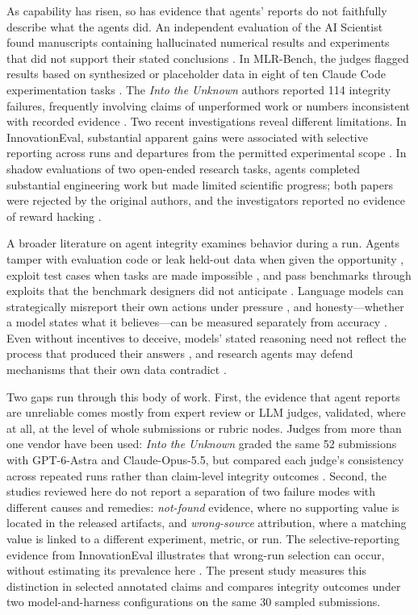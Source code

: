 \documentclass[preprint,12pt,authoryear]{elsarticle}
\begin{document}
As capability has risen, so has evidence that agents' reports do not faithfully describe what the agents did. An independent evaluation of the AI Scientist found manuscripts containing hallucinated numerical results and experiments that did not support their stated conclusions \citep{beel2025sakana}. In MLR-Bench, the judges flagged results based on synthesized or placeholder data in eight of ten Claude Code experimentation tasks \citep{chen2025mlrbench}. The \emph{Into the Unknown} authors reported 114 integrity failures, frequently involving claims of unperformed work or numbers inconsistent with recorded evidence \citep{kim2026unknown}. Two recent investigations reveal different limitations. In InnovationEval, substantial apparent gains were associated with selective reporting across runs and departures from the permitted experimental scope \citep{owen2026innovationeval}. In shadow evaluations of two open-ended research tasks, agents completed substantial engineering work but made limited scientific progress; both papers were rejected by the original authors, and the investigators reported no evidence of reward hacking \citep{kirgis2026openended}.

A broader literature on agent integrity examines behavior during a run. Agents tamper with evaluation code or leak held-out data when given the opportunity \citep{atinafu2026rewardhacking}, exploit test cases when tasks are made impossible \citep{zhong2026impossiblebench}, and pass benchmarks through exploits that the benchmark designers did not anticipate \citep{luo2026unearned}. Language models can strategically misreport their own actions under pressure \citep{scheurer2023deceive}, and honesty---whether a model states what it believes---can be measured separately from accuracy \citep{ren2025mask}. Even without incentives to deceive, models' stated reasoning need not reflect the process that produced their answers \citep{turpin2023unfaithful,lanham2023faithfulness}, and research agents may defend mechanisms that their own data contradict \citep{eulig2026cawm}.

Two gaps run through this body of work. First, the evidence that agent reports are unreliable comes mostly from expert review or LLM judges, validated, where at all, at the level of whole submissions or rubric nodes. Judges from more than one vendor have been used: \emph{Into the Unknown} graded the same 52 submissions with GPT-6-Astra and Claude-Opus-5.5, but compared each judge's consistency across repeated runs rather than claim-level integrity outcomes \citep[Appendix B]{kim2026unknown}. Second, the studies reviewed here do not report a separation of two failure modes with different causes and remedies: \emph{not-found} evidence, where no supporting value is located in the released artifacts, and \emph{wrong-source} attribution, where a matching value is linked to a different experiment, metric, or run. The selective-reporting evidence from InnovationEval illustrates that wrong-run selection can occur, without estimating its prevalence here \citep{owen2026innovationeval}. The present study measures this distinction in selected annotated claims and compares integrity outcomes under two model-and-harness configurations on the same 30 sampled submissions.
\end{document}
